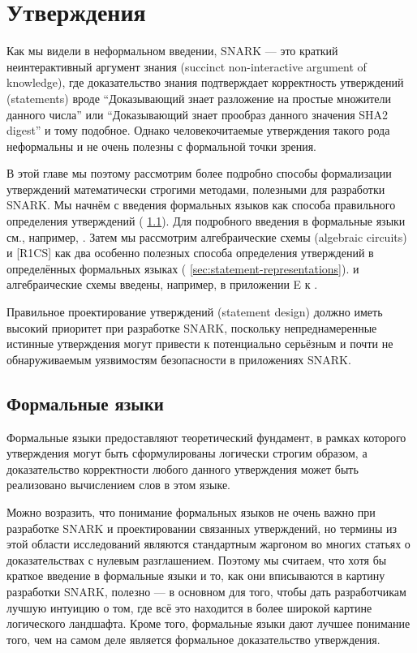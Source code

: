 \chapter{Утверждения}\label{sec:statements}\label{chap:statements}

Как мы видели в неформальном введении, SNARK — это краткий неинтерактивный аргумент знания (succinct non-interactive argument of knowledge), где доказательство знания подтверждает корректность утверждений (statements) вроде ``Доказывающий знает разложение на простые множители данного числа'' или ``Доказывающий знает прообраз данного значения SHA2 digest'' и тому подобное. Однако человекочитаемые утверждения такого рода неформальны и не очень полезны с формальной точки зрения.

В этой главе мы поэтому рассмотрим более подробно способы формализации утверждений математически строгими методами, полезными для разработки SNARK. Мы начнём с введения формальных языков как способа правильного определения утверждений (\secname{} \ref{sec:formal-languages}). Для подробного введения в формальные языки см., например, \cite{moll-2012}. Затем мы рассмотрим алгебраические схемы (algebraic circuits) и  [R1CS] как два особенно полезных способа определения утверждений в определённых формальных языках (\secname{} \ref{sec:statement-representations}).  и алгебраические схемы введены, например, в приложении E к \cite{sasson-2013}.

Правильное проектирование утверждений (statement design) должно иметь высокий приоритет при разработке SNARK, поскольку непреднамеренные истинные утверждения могут привести к потенциально серьёзным и почти не обнаруживаемым уязвимостям безопасности в приложениях SNARK.

\section{Формальные языки}\label{sec:formal-languages}

Формальные языки предоставляют теоретический фундамент, в рамках которого утверждения могут быть сформулированы логически строгим образом, а доказательство корректности любого данного утверждения может быть реализовано вычислением слов в этом языке.

Можно возразить, что понимание формальных языков не очень важно при разработке SNARK и проектировании связанных утверждений, но термины из этой области исследований являются стандартным жаргоном во многих статьях о доказательствах с нулевым разглашением. Поэтому мы считаем, что хотя бы краткое введение в формальные языки и то, как они вписываются в картину разработки SNARK, полезно — в основном для того, чтобы дать разработчикам лучшую интуицию о том, где всё это находится в более широкой картине логического ландшафта. Кроме того, формальные языки дают лучшее понимание того, чем на самом деле является формальное доказательство утверждения.

